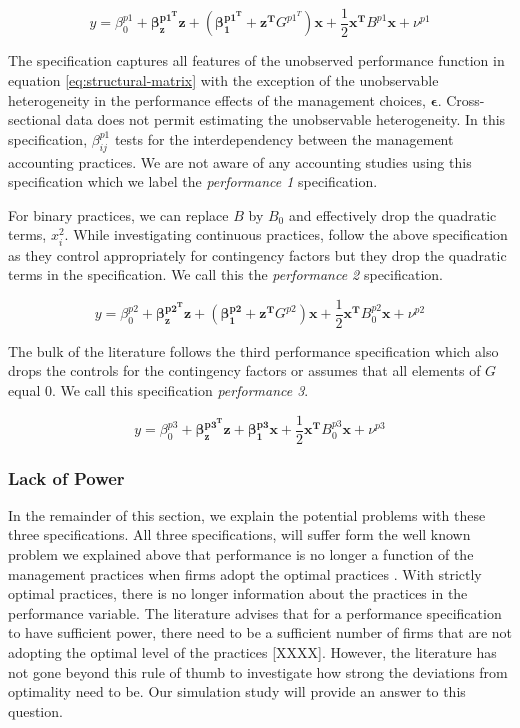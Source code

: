 \documentclass[12pt]{article}
\begin{document}
\begin{equation*}
    y = \beta_0^{p1} + \mathbf{\beta_z^{p1^T} z} + (\mathbf{\beta_1^{p1^T}} + \mathbf{z^T} G^{p1^T}) \mathbf{x} + 
    \frac{1}{2}\mathbf{x^T} B^{p1} \mathbf{x} + \nu^{p1}
\end{equation*}

The specification captures all features of the unobserved performance function in equation \eqref{eq:structural-matrix} with the exception of the unobservable heterogeneity in the performance effects of the management choices, $\mathbf{\epsilon}$. Cross-sectional data does not permit estimating the unobservable heterogeneity. In this specification, \(\beta_{ij}^{p1}\) tests for the interdependency between the management accounting practices. We are not aware of any accounting studies using this specification which we label the \emph{performance 1} specification. 

For binary practices, we can replace $B$ by $B_0$ and effectively drop the quadratic terms, $x_i^2$.  While investigating continuous practices, \citet{Bedford2016} follow the above specification as they control appropriately for contingency factors but they drop the quadratic terms in the specification. We call this the \emph{performance 2} specification.

\begin{equation*}
    y = \beta_0^{p2} + \mathbf{\beta_z^{p2^T} z} + (\mathbf{\beta_1^{p2}} + \mathbf{z^T} G^{p2}) \mathbf{x} + 
    \frac{1}{2}\mathbf{x^T} B_0^{p2} \mathbf{x} + \nu^{p2}
\end{equation*}

The bulk of the literature follows the third performance specification which also drops the controls for the contingency factors or assumes that all elements of $G$ equal $0$. We call this specification \emph{performance 3}.

\begin{equation*}
    y = \beta_0^{p3} + \mathbf{\beta_z^{p3^T} z} + \mathbf{\beta_1^{p3}} \mathbf{x} + 
    \frac{1}{2}\mathbf{x^T} B_0^{p3} \mathbf{x} + \nu^{p3}
\end{equation*}

\subsubsection{Lack of Power}

In the remainder of this section, we explain the potential problems with these three specifications. All three specifications, will suffer form the well known problem we explained above that performance is no longer a function of the management practices when firms adopt the optimal practices \citep{Grabner2013}. With strictly optimal practices, there is no longer information about the practices in the performance variable. The literature advises that for a performance specification to have sufficient power, there need to be a sufficient number of firms that are not adopting the optimal level of the practices [XXXX]. However, the literature has not gone beyond this rule of thumb to investigate how strong the deviations from optimality need to be. Our simulation study will provide an answer to this question.
\end{document}
